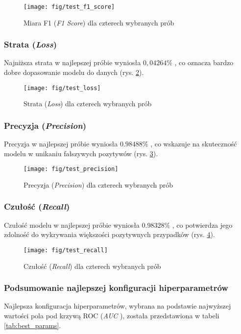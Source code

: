 \documentclass[eeg_v4.tex]{subfiles}
\begin{document}
    \begin{figure}[h!]
        \centering
        \texttt{[image: fig/test\_f1\_score]}
        \caption{Miara F1 (\textit{F1 Score}) dla czterech wybranych prób}
        \label{fig:f1}
    \end{figure}

    \subsubsection{Strata (\textit{Loss})}
    Najniższa strata w najlepszej próbie wyniosła \(0,04264\%\)
    , co oznacza bardzo dobre dopasowanie modelu do danych (rys. \ref{fig:loss}).

    \begin{figure}[h!]
        \centering
        \texttt{[image: fig/test\_loss]}
        \caption{Strata (\textit{Loss}) dla czterech wybranych prób}
        \label{fig:loss}
    \end{figure}

    \subsubsection{Precyzja (\textit{Precision})}
    Precyzja w najlepszej próbie wyniosła \(0.98488\%\)
    , co wskazuje na skuteczność modelu w unikaniu fałszywych pozytywów (rys. \ref{fig:precision}).

    \begin{figure}[h!]
        \centering
        \texttt{[image: fig/test\_precision]}
        \caption{Precyzja (\textit{Precision}) dla czterech wybranych prób}
        \label{fig:precision}
    \end{figure}

    \subsubsection{Czułość (\textit{Recall})}
    Czułość modelu w najlepszej próbie wyniosła \(0.98328\%\)
    , co potwierdza jego zdolność do wykrywania większości pozytywnych przypadków (rys. \ref{fig:recall}).

    \begin{figure}[h!]
        \centering
        \texttt{[image: fig/test\_recall]}
        \caption{Czułość (\textit{Recall}) dla czterech wybranych prób}
        \label{fig:recall}
    \end{figure}

    \subsubsection{Podsumowanie najlepszej konfiguracji hiperparametrów}
    Najlepsza konfiguracja hiperparametrów, wybrana na podstawie najwyższej wartości pola pod krzywą ROC (\textit{AUC}
    ), została przedstawiona w tabeli \ref{tab:best_params}.
\end{document}
